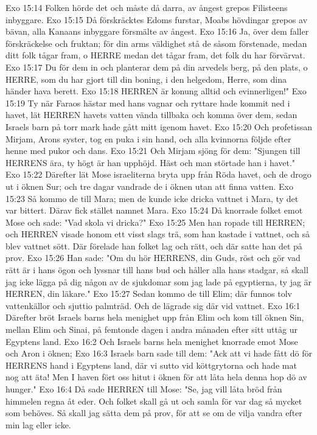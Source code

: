 Exo 15:14  Folken hörde det och måste då darra, av ångest grepos Filisteens inbyggare.
Exo 15:15  Då förskräcktes Edoms furstar, Moabs hövdingar grepos av bävan, alla Kanaans inbyggare försmälte av ångest.
Exo 15:16  Ja, över dem faller förskräckelse och fruktan; för din arms väldighet stå de såsom förstenade, medan ditt folk tågar fram, o HERRE medan det tågar fram, det folk du har förvärvat.
Exo 15:17  Du för dem in och planterar dem på din arvedels berg, på den plats, o HERRE, som du har gjort till din boning, i den helgedom, Herre, som dina händer hava berett.
Exo 15:18  HERREN är konung alltid och evinnerligen!"
Exo 15:19  Ty när Faraos hästar med hans vagnar och ryttare hade kommit ned i havet, lät HERREN havets vatten vända tillbaka och komma över dem, sedan Israels barn på torr mark hade gått mitt igenom havet.
Exo 15:20  Och profetissan Mirjam, Arons syster, tog en puka i sin hand, och alla kvinnorna följde efter henne med pukor och dans.
Exo 15:21  Och Mirjam sjöng för dem: "Sjungen till HERRENS ära, ty högt är han upphöjd. Häst och man störtade han i havet."
Exo 15:22  Därefter lät Mose israeliterna bryta upp från Röda havet, och de drogo ut i öknen Sur; och tre dagar vandrade de i öknen utan att finna vatten.
Exo 15:23  Så kommo de till Mara; men de kunde icke dricka vattnet i Mara, ty det var bittert. Därav fick stället namnet Mara.
Exo 15:24  Då knorrade folket emot Mose och sade: "Vad skola vi dricka?"
Exo 15:25  Men han ropade till HERREN; och HERREN visade honom ett visst slags trä, som han kastade i vattnet, och så blev vattnet sött. Där förelade han folket lag och rätt, och där satte han det på prov.
Exo 15:26  Han sade: "Om du hör HERRENS, din Guds, röst och gör vad rätt är i hans ögon och lyssnar till hans bud och håller alla hans stadgar, så skall jag icke lägga på dig någon av de sjukdomar som jag lade på egyptierna, ty jag är HERREN, din läkare."
Exo 15:27  Sedan kommo de till Elim; där funnos tolv vattenkällor och sjuttio palmträd. Och de lägrade sig där vid vattnet.
Exo 16:1  Därefter bröt Israels barns hela menighet upp från Elim och kom till öknen Sin, mellan Elim och Sinai, på femtonde dagen i andra månaden efter sitt uttåg ur Egyptens land.
Exo 16:2  Och Israels barns hela menighet knorrade emot Mose och Aron i öknen;
Exo 16:3  Israels barn sade till dem: "Ack att vi hade fått dö för HERRENS hand i Egyptens land, där vi sutto vid köttgrytorna och hade mat nog att äta! Men I haven fört oss hitut i öknen för att låta hela denna hop dö av hunger."
Exo 16:4  Då sade HERREN till Mose: "Se, jag vill låta bröd från himmelen regna åt eder. Och folket skall gå ut och samla för var dag så mycket som behöves. Så skall jag sätta dem på prov, för att se om de vilja vandra efter min lag eller icke.
